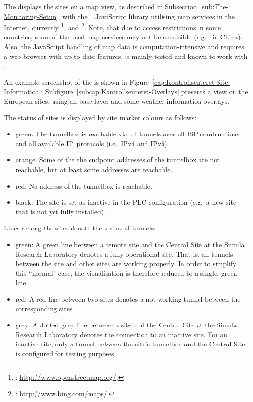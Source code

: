 The  displays the  sites on a map view, as described in Subsection~\ref{sub:The-Monitoring-Setup}, with the ~\cite{OpenLayersDoc} JavaScript library utilising map services in the Internet, currently \footnote{: \url{http://www.openstreetmap.org/}.},  and \footnote{: \url{http://www.bing.com/maps/}.}. Note, that due to access restrictions in some countries, some of the used map services may not be accessible (e.g.\  in China). Also, the JavaScript handling of map data is computation-intensive and requires a web browser with up-to-date features.  is mainly tested and known to work with .

An example screenshot of the  is shown in Figure~\ref{cap:Kontrollsenteret-Site-Information}: Subfigure~\ref{subcap:Kontrollsenteret-Overlays} presents a view on the European  sites, using an  base layer and some weather information overlays.

The status of sites is displayed by site marker colours as follows:
\begin{itemize}
 \item green: The tunnelbox is reachable via all tunnels over all ISP combinations and all available IP~protocols (i.e.\ IPv4 and IPv6).
 \item orange: Some of the the endpoint addresses of the tunnelbox are not reachable, but at least some addresses are reachable.
 \item red: No address of the tunnelbox is reachable.
 \item black: The site is set as inactive in the PLC configuration (e.g.\ a new site that is not yet fully installed).
\end{itemize}
Lines among the sites denote the status of tunnels:
\begin{itemize}
 \item green: A green line between a remote site and the Central Site at the Simula Research Laboratory denotes a fully-operational site. That is, all tunnels between the site and other sites are working properly. In order to simplify this ``normal'' case, the visualisation is therefore reduced to a single, green line.
 
 \item red: A red line between two sites denotes a not-working tunnel between the corresponding sites.
 
 \item grey: A dotted grey line between a site and the Central Site at the Simula Research Laboratory denotes the connection to an inactive site. For an inactive site, only a tunnel between the site's tunnelbox and the Central Site is configured for testing purposes.
\end{itemize}

